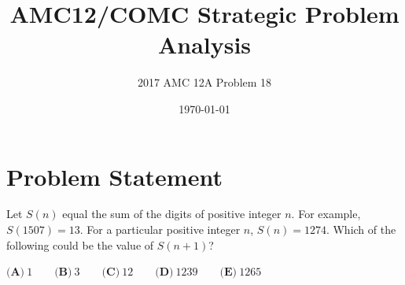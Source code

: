 \documentclass[]{article}
\begin{document}
\title{\textbf{AMC12/COMC Strategic Problem Analysis}}
\author{2017 AMC 12A Problem 18}
\date{\today}
\maketitle

\section*{Problem Statement}
Let $S(n)$ equal the sum of the digits of positive integer $n$. For example, $S(1507) = 13$. For a particular positive integer $n$, $S(n) = 1274$. Which of the following could be the value of $S(n+1)$?

$\textbf{(A)}\ 1 \qquad\textbf{(B)}\ 3\qquad\textbf{(C)}\ 12\qquad\textbf{(D)}\ 1239\qquad\textbf{(E)}\ 1265$
\end{document}
